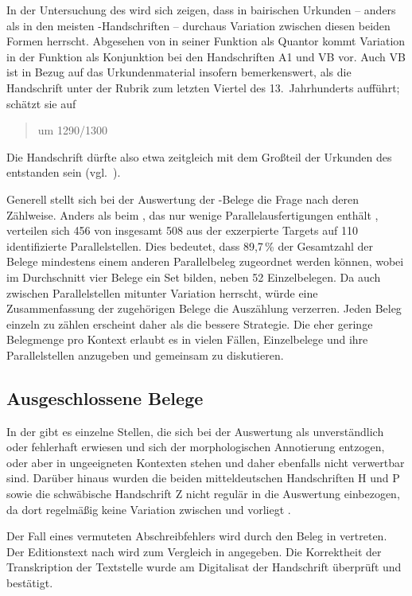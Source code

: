 In der Untersuchung des \CAO{} wird sich zeigen, dass in
bairischen Urkunden -- anders als in den meisten
\KC{}-Handschriften -- durchaus Variation zwischen diesen beiden Formen
herrscht. Abgesehen von  in seiner Funktion als Quantor kommt
Variation in der Funktion als Konjunktion bei den Handschriften A1 und VB vor.
Auch VB ist in Bezug auf das Urkundenmaterial insofern bemerkenswert, als
\citet[224]{schneider1987} die Handschrift unter der Rubrik zum letzten Viertel
des 13.~Jahrhunderts aufführt; \citet[65]{wolf:kckat} schätzt sie auf
\blockquote{um 1290/1300}. Die Handschrift dürfte also etwa
zeitgleich mit dem Großteil der Urkunden des \CAO{} entstanden sein
(vgl.~).

Generell stellt sich bei der Auswertung der \KC{}-Belege die Frage nach deren
Zählweise. Anders als beim \CAO{}, das nur wenige Parallelausfertigungen
enthält \autocite[vgl.][326--328]{ganslmayeretal2003}, verteilen sich 456 von
insgesamt 508 aus der \KC{} exzerpierte Targets auf 110 identifizierte
Parallelstellen. Dies bedeutet, dass 89,7\,\% der Gesamtzahl der Belege
mindestens einem anderen Parallelbeleg zugeordnet werden können, wobei im
Durchschnitt vier Belege ein Set bilden, neben 52 Einzelbelegen. Da auch
zwischen Parallelstellen mitunter Variation herrscht, würde eine
Zusammenfassung der zugehörigen Belege die Auszählung verzerren. Jeden Beleg
einzeln zu zählen erscheint daher als die bessere Strategie. Die eher geringe
Belegmenge pro Kontext erlaubt es in vielen Fällen, Einzelbelege und ihre
Parallelstellen anzugeben und gemeinsam zu diskutieren.

\subsection{Ausgeschlossene Belege}
\label{subsec:ausgeschlossene_kc}

In der \KC{} gibt es einzelne Stellen, die sich bei der Auswertung als
unverständlich oder fehlerhaft erwiesen und sich der morphologischen
Annotierung entzogen, oder aber in ungeeigneten Kontexten stehen und daher
ebenfalls nicht verwertbar sind. Darüber hinaus wurden die beiden
mitteldeutschen Handschriften H und P sowie die
schwäbische Handschrift Z nicht regulär in die Auswertung
einbezogen, da dort regelmäßig keine Variation zwischen  und
 vorliegt \autocite[vgl. auch][183]{ksw2}.

Der Fall eines vermuteten Abschreibfehlers wird durch den Beleg in
 vertreten. Der Editionstext nach \citet{schroeder1895}
wird zum Vergleich in  angegeben. Die Korrektheit
der Transkription der Textstelle wurde am Digitalisat der Handschrift überprüft
und bestätigt.

